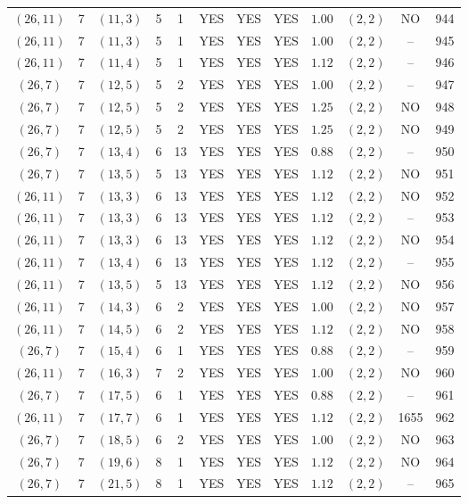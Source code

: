 \begin{longtable}{|c|c|c|c|c|c|c|c|c|c|c|c|}
$(26,11)$ & 7 & $(11,3)$ & 5 & 1 & YES & YES & YES & $1.00$ & $(2,2)$ & NO & 944\\
$(26,11)$ & 7 & $(11,3)$ & 5 & 1 & YES & YES & YES & $1.00$ & $(2,2)$ & -- & 945\\
$(26,11)$ & 7 & $(11,4)$ & 5 & 1 & YES & YES & YES & $1.12$ & $(2,2)$ & -- & 946\\
$(26,7)$ & 7 & $(12,5)$ & 5 & 2 & YES & YES & YES & $1.00$ & $(2,2)$ & -- & 947\\
$(26,7)$ & 7 & $(12,5)$ & 5 & 2 & YES & YES & YES & $1.25$ & $(2,2)$ & NO & 948\\
$(26,7)$ & 7 & $(12,5)$ & 5 & 2 & YES & YES & YES & $1.25$ & $(2,2)$ & NO & 949\\
$(26,7)$ & 7 & $(13,4)$ & 6 & 13 & YES & YES & YES & $0.88$ & $(2,2)$ & -- & 950\\
$(26,7)$ & 7 & $(13,5)$ & 5 & 13 & YES & YES & YES & $1.12$ & $(2,2)$ & NO & 951\\
$(26,11)$ & 7 & $(13,3)$ & 6 & 13 & YES & YES & YES & $1.12$ & $(2,2)$ & NO & 952\\
$(26,11)$ & 7 & $(13,3)$ & 6 & 13 & YES & YES & YES & $1.12$ & $(2,2)$ & -- & 953\\
$(26,11)$ & 7 & $(13,3)$ & 6 & 13 & YES & YES & YES & $1.12$ & $(2,2)$ & NO & 954\\
$(26,11)$ & 7 & $(13,4)$ & 6 & 13 & YES & YES & YES & $1.12$ & $(2,2)$ & -- & 955\\
$(26,11)$ & 7 & $(13,5)$ & 5 & 13 & YES & YES & YES & $1.12$ & $(2,2)$ & NO & 956\\
$(26,11)$ & 7 & $(14,3)$ & 6 & 2 & YES & YES & YES & $1.00$ & $(2,2)$ & NO & 957\\
$(26,11)$ & 7 & $(14,5)$ & 6 & 2 & YES & YES & YES & $1.12$ & $(2,2)$ & NO & 958\\
$(26,7)$ & 7 & $(15,4)$ & 6 & 1 & YES & YES & YES & $0.88$ & $(2,2)$ & -- & 959\\
$(26,11)$ & 7 & $(16,3)$ & 7 & 2 & YES & YES & YES & $1.00$ & $(2,2)$ & NO & 960\\
$(26,7)$ & 7 & $(17,5)$ & 6 & 1 & YES & YES & YES & $0.88$ & $(2,2)$ & -- & 961\\
$(26,11)$ & 7 & $(17,7)$ & 6 & 1 & YES & YES & YES & $1.12$ & $(2,2)$ & 1655 & 962\\
$(26,7)$ & 7 & $(18,5)$ & 6 & 2 & YES & YES & YES & $1.00$ & $(2,2)$ & NO & 963\\
$(26,7)$ & 7 & $(19,6)$ & 8 & 1 & YES & YES & YES & $1.12$ & $(2,2)$ & NO & 964\\
$(26,7)$ & 7 & $(21,5)$ & 8 & 1 & YES & YES & YES & $1.12$ & $(2,2)$ & -- & 965\\

\end{longtable}
